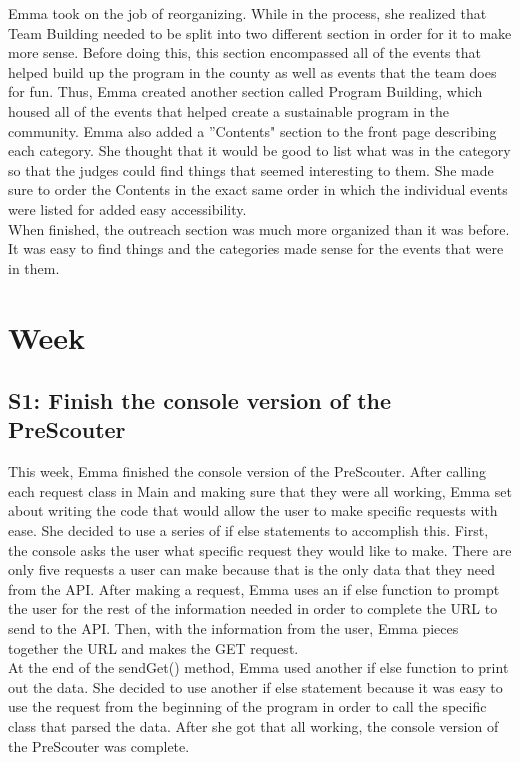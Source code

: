 \documentclass{article}
\begin{document}
Emma took on the job of reorganizing. While in the process, she realized that Team Building needed to be split into two different section in order for it to make more sense. Before doing this, this section encompassed all of the events that helped build up the program in the county as well as events that the team does for fun. Thus, Emma created another section called Program Building, which housed all of the events that helped create a sustainable program in the community. Emma also added a ''Contents" section to the front page describing each category. She thought that it would be good to list what was in the category so that the judges could find things that seemed interesting to them. She made sure to order the Contents in the exact same order in which the individual events were listed for added easy accessibility. \\

When finished, the outreach section was much more organized than it was before. It was easy to find things and the categories made sense for the events that were in them. 
\clearpage \newpage \section{Week \thesection} 
\subsection{S1: Finish the console version of the PreScouter}

This week, Emma finished the console version of the PreScouter. After calling each request class in Main and making sure that they were all working, Emma set about writing the code that would allow the user to make specific requests with ease. She decided to use a series of if else statements to accomplish this. First, the console asks the user what specific request they would like to make. There are only five requests a user can make because that is the only data that they need from the API. After making a request, Emma uses an if else function to prompt the user for the rest of the information needed in order to complete the URL to send to the API. Then, with the information from the user, Emma pieces together the URL and makes the GET request.\\

At the end of the sendGet() method, Emma used another if else function to print out the data. She decided to use another if else statement because it was easy to use the request from the beginning of the program in order to call the specific class that parsed the data. After she got that all working, the console version of the PreScouter was complete. \\
\end{document}

